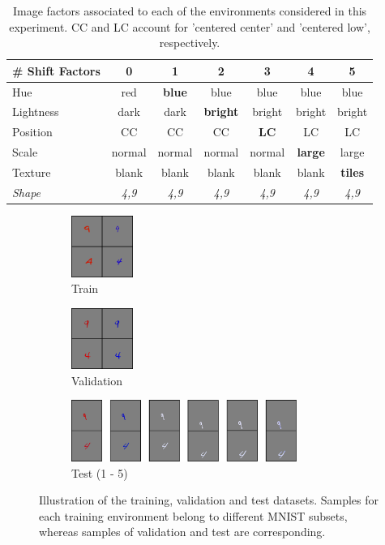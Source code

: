 \begin{table}[H]
    \centering
    \begin{tabular}{l|c|c|c|c|c|c}
    \# Shift Factors & 0 & 1 & 2 & 3 & 4 & 5 \\
    \midrule
    Hue & red & \textbf{blue} & blue & blue & blue & blue \\
    Lightness & dark & dark & \textbf{bright} & bright & bright & bright \\
    Position  & CC & CC & CC & \textbf{LC} & LC & LC \\
    Scale  & normal & normal & normal & normal & \textbf{large} & large \\
    Texture & blank & blank & blank & blank & blank & \textbf{tiles} \\
    \textit{Shape} & \textit{4,9} &  \textit{4,9} &  \textit{4,9} & \textit{4,9} & \textit{4,9} & \textit{4,9} \\
    \bottomrule
    \end{tabular}
    \caption{
    Image factors associated to each of the environments considered in this experiment. CC and LC account
    for 'centered center' and 'centered low', respectively.
    }
    \label{tab:data_shift_table}
\end{table}


\begin{figure}[H]
    \centering
    \begin{subfigure}[b]{0.2\textwidth}
        \centering
        \includegraphics[height=2cm]{img/results_discussion/datashift/dsimages/train_collage.png}
        \caption*{Train}
    \end{subfigure}%
    \hfill
    \begin{subfigure}[b]{0.2\textwidth}
        \centering
        \includegraphics[height=2cm]{img/results_discussion/datashift/dsimages/val_collage.png}
        \caption*{Validation}
    \end{subfigure}%
    \hfill
    \begin{subfigure}[b]{0.6\textwidth}
        \centering
        \includegraphics[height=2cm]{img/results_discussion/datashift/dsimages/test_collage2.png}
        \caption*{Test (1 - 5)}
    \end{subfigure}
    \caption{
    Illustration of the training, validation and test datasets. Samples for each
    training environment belong to different MNIST subsets, whereas samples of
    validation and test are corresponding.
    }
    \label{fig:data_shift_images}
\end{figure}


